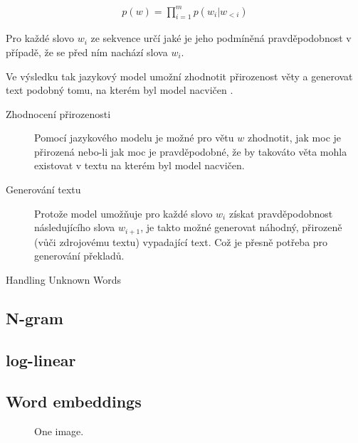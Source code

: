 \begin{align}\label{figure:probdistr}
  p(w) = \prod_{i=1}^{m} p(w_i|w_{<i})
\end{align}

Pro každé slovo $w_i$ ze sekvence určí jaké je jeho podmíněná pravděpodobnost v případě, že se před ním nachází slova $w_i$.

Ve výsledku tak jazykový model umožní zhodnotit přirozenost věty a generovat text podobný tomu, na kterém byl model nacvičen \cite{nmtTutorial}.

\begin{description}
  \item[Zhodnocení přirozenosti] Pomocí jazykového modelu je možné pro větu $w$ zhodnotit, jak moc je přirozená nebo-li jak moc je pravděpodobné, že by takováto věta mohla existovat v textu na kterém byl model nacvičen.
  \item[Generování textu] Protože model umožňuje pro každé slovo $w_i$ získat pravděpodobnost následujícího slova $w_{i+1}$, je takto možné generovat náhodný, přirozeně (vůči zdrojovému textu) vypadající text. Což je přesně potřeba pro generování překladů.
\end{description}





Handling Unknown Words \cite{nmtTutorial}

\subsection{N-gram}
\subsection{log-linear}


\subsection{Word embeddings}\label{section:embeddings}


\begin{figure}
    \begin{center}
    \end{center}
	\caption{One image. }
	\label{img:TODO}
\end{figure}

